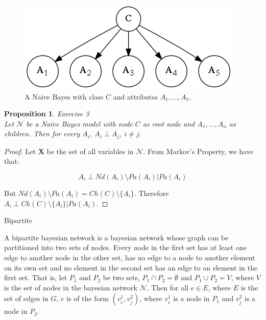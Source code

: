 \documentclass{amsart}
\makeatletter
\def\subsection{\@startsection{subsection}{3}%
  \z@{.5\linespacing\@plus.7\linespacing}{.1\linespacing}%
  {\normalfont\itshape}}
\theoremstyle{plain}
\newtheorem{proposition}{Proposition}
\makeatother
\begin{document}
\begin{figure}[h]
  \captionsetup{justification=centering}
  \centering\includegraphics[scale=0.5]{graphs/naive_bayes.png}
  \caption{A Naive Bayes with class $C$ and attributes $A_1,\ldots,A_5$.}
\end{figure}

\begin{proposition} Exercise 3\\
  Let $\mathcal{N}$ be a Naive Bayes model with node $C$ as root node and $A_1,\ldots,A_n$ as
  children. Then for every $A_i$, $A_i \perp A_j$, $i\neq j$.
\end{proposition}

\begin{proof}
  Let $\mathbf{X}$ be the set of all variables in $\mathcal{N}$. From Markov's Property, we have
  that:

  \begin{equation*}
    A_i \perp Nd(A_i)\setminus Pa(A_i) | Pa(A_i)
  \end{equation*}

  But $Nd(A_i)\setminus Pa(A_i)=Ch(C)\setminus \{A_i\}$. Therefore $A_i \perp Ch(C)\setminus
  \{A_i\}|Pa(A_i)$.
\end{proof}

\subsection{Bipartite}

A bipartite bayesian network is a bayesian network whose graph can be partitioned into two sets of
nodes. Every node in the first set has at least one edge to another node in the other set, has
no edge to a node to another element on its own set and no element in the second set has an edge
to an element in the first set. That is, let $P_1$ and $P_2$ be two sets, $P_1\cap P_2=\emptyset$
and $P_1\cup P_2=V$, where $V$ is the set of nodes in the bayesian network $\mathcal{N}$. Then for
all $e\in E$, where $E$ is the set of edges in $G$, $e$ is of the form $(v_i^1,v_j^2)$, where
$v_i^1$ is a node in $P_1$ and $v_j^2$ is a node in $P_2$.
\end{document}
